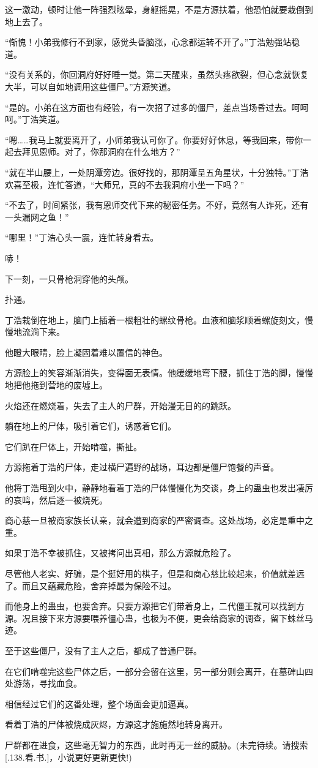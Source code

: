 \begin{this_body}
这一激动，顿时让他一阵强烈眩晕，身躯摇晃，不是方源扶着，他恐怕就要栽倒到地上去了。

“惭愧！小弟我修行不到家，感觉头昏脑涨，心念都运转不开了。”丁浩勉强站稳道。

“没有关系的，你回洞府好好睡一觉。第二天醒来，虽然头疼欲裂，但心念就恢复大半，可以自如地调用这些僵尸。”方源笑道。

“是的。小弟在这方面也有经验，有一次招了过多的僵尸，差点当场昏过去。呵呵呵。”丁浩笑道。

“嗯……我马上就要离开了，小师弟我认可你了。你要好好休息，等我回来，带你一起去拜见恩师。对了，你那洞府在什么地方？”

“就在半山腰上，一处阴潭旁边。很好找的，那阴潭呈五角星状，十分独特。”丁浩欢喜至极，连忙答道，“大师兄，真的不去我洞府小坐一下吗？”

“不去了，时间紧张，我有恩师交代下来的秘密任务。不好，竟然有人诈死，还有一头漏网之鱼！”

“哪里！”丁浩心头一震，连忙转身看去。

哧！

下一刻，一只骨枪洞穿他的头颅。

扑通。

丁浩栽倒在地上，脑门上插着一根粗壮的螺纹骨枪。血液和脑浆顺着螺旋刻文，慢慢地流淌下来。

他瞪大眼睛，脸上凝固着难以置信的神色。

方源脸上的笑容渐渐消失，变得面无表情。他缓缓地弯下腰，抓住丁浩的脚，慢慢地把他拖到营地的废墟上。

火焰还在燃烧着，失去了主人的尸群，开始漫无目的的跳跃。

躺在地上的尸体，吸引着它们，诱惑着它们。

它们趴在尸体上，开始啃噬，撕扯。

方源拖着丁浩的尸体，走过横尸遍野的战场，耳边都是僵尸饱餐的声音。

他将丁浩甩到火中，静静地看着丁浩的尸体慢慢化为交谈，身上的蛊虫也发出凄厉的哀鸣，然后逐一被烧死。

商心慈一旦被商家族长认亲，就会遭到商家的严密调查。这处战场，必定是重中之重。

如果丁浩不幸被抓住，又被拷问出真相，那么方源就危险了。

尽管他人老实、好骗，是个挺好用的棋子，但是和商心慈比较起来，价值就差远了。而且又蕴藏危险，舍弃掉最为保险不过。

而他身上的蛊虫，也要舍弃。只要方源把它们带着身上，二代僵王就可以找到方源。况且接下来方源要喂养僵心蛊，也极为不便，更会给商家的调查，留下蛛丝马迹。

至于这些僵尸，没有了主人之后，都成了普通尸群。

在它们啃噬完这些尸体之后，一部分会留在这里，另一部分则会离开，在墓碑山四处游荡，寻找血食。

相信经过它们的这番处理，整个场面会更加逼真。

看着丁浩的尸体被烧成灰烬，方源这才施施然地转身离开。

尸群都在进食，这些毫无智力的东西，此时再无一丝的威胁。(未完待续。请搜索[.138.看.书.]，小说更好更新更快!)

\end{this_body}

